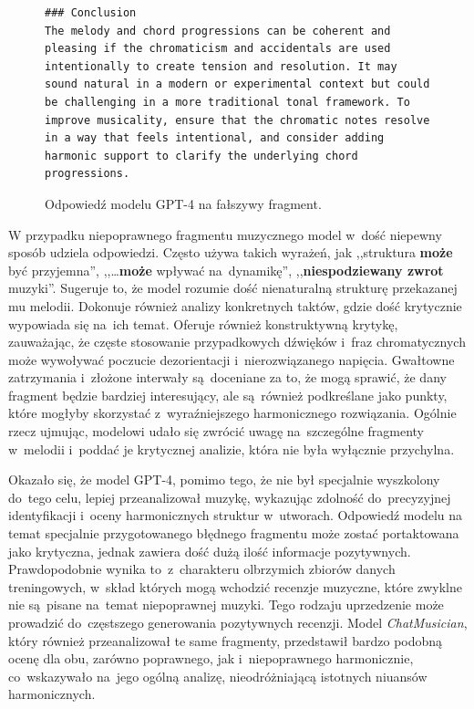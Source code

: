 \documentclass[data-science]{agh-wi} %
\begin{document}
\begin{figure}[ht!]
\begin{verbatim}
### Conclusion
The melody and chord progressions can be coherent and pleasing if the chromaticism and accidentals are used intentionally to create tension and resolution. It may sound natural in a modern or experimental context but could be challenging in a more traditional tonal framework. To improve musicality, ensure that the chromatic notes resolve in a way that feels intentional, and consider adding harmonic support to clarify the underlying chord progressions.
\end{verbatim}
    \caption{Odpowiedź modelu GPT-4 na fałszywy fragment.}\label{code:gpt4bad}
\end{figure}

W przypadku niepoprawnego fragmentu muzycznego model w~dość niepewny sposób udziela odpowiedzi. Często używa takich wyrażeń, jak ,,struktura \textbf{może} być przyjemna'', ,,\dots \textbf{może} wpływać na~dynamikę'', ,,\textbf{niespodziewany zwrot} muzyki''. Sugeruje to, że model rozumie dość nienaturalną strukturę przekazanej mu melodii. Dokonuje również analizy konkretnych taktów, gdzie dość krytycznie wypowiada się na~ich temat. Oferuje również konstruktywną krytykę, zauważając, że częste stosowanie przypadkowych dźwięków i~fraz chromatycznych może wywoływać poczucie dezorientacji i~nierozwiązanego napięcia. Gwałtowne zatrzymania i~złożone interwały są~doceniane za to, że mogą sprawić, że dany fragment będzie bardziej interesujący, ale są~również podkreślane jako punkty, które mogłyby skorzystać z~wyraźniejszego harmonicznego rozwiązania. Ogólnie rzecz ujmując, modelowi udało się zwrócić uwagę na~szczególne fragmenty w~melodii i~poddać je krytycznej analizie, która nie była wyłącznie przychylna.

Okazało się, że model GPT-4, pomimo tego, że nie był specjalnie wyszkolony do~tego celu, lepiej przeanalizował muzykę, wykazując zdolność do~precyzyjnej identyfikacji i~oceny harmonicznych struktur w~utworach. Odpowiedź modelu na temat specjalnie przygotowanego błędnego fragmentu może zostać portaktowana jako krytyczna, jednak zawiera dość dużą ilość informacje pozytywnych. Prawdopodobnie wynika to~z~charakteru olbrzymich zbiorów danych treningowych, w~skład których mogą wchodzić recenzje muzyczne, które zwyklne nie są~pisane na~temat niepoprawnej muzyki. Tego rodzaju uprzedzenie może prowadzić do~częstszego generowania pozytywnych recenzji. Model \textit{ChatMusician}, który również przeanalizował te same fragmenty, przedstawił bardzo podobną ocenę dla obu, zarówno poprawnego, jak i~niepoprawnego harmonicznie, co~wskazywało na~jego ogólną analizę, nieodróżniającą istotnych niuansów harmonicznych.
\end{document}
